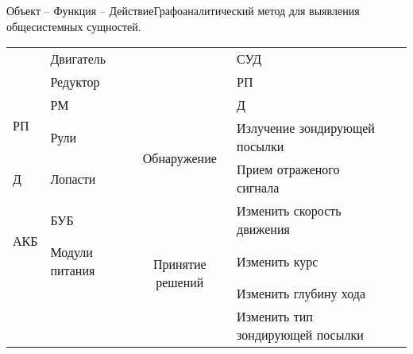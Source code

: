 \begin{frame}{Объект -- Функция -- Действие}{\small Графоаналитический метод для выявления общесистемных сущностей.}
\begin{tabular}{cp{}||c|p{}||cp{}}
    \multicolumn{1}{|l|}{}                     & Двигатель                                   &                                    & СУД                              &                                           &                                           \\ \cline{2-2} \cline{4-4}
    \multicolumn{1}{|l|}{}                     & Редуктор                                    &                                    & РП                               &                                           &                                           \\ \cline{1-2} \cline{4-4}
    \multicolumn{1}{|l|}{\multirow{2}{*}{РП}}  & РМ                                          &                                    & Д                                &                                           &                                           \\ \cline{2-4}
    \multicolumn{1}{|l|}{}                     & Рули                                        & \multirow{2}{*}{Обнаружение}       & Излучение зондирующей посылки    &                                           &                                           \\ \cline{1-2} \cline{4-4}
    \multicolumn{1}{|l|}{Д}                    & Лопасти                                     &                                    & Прием отраженого сигнала         &                                           &                                           \\ \cline{1-4}
    \multicolumn{1}{|l|}{\multirow{2}{*}{АКБ}} & БУБ                                         & \multirow{4}{*}{Принятие решений}  & Изменить скорость движения       &                                           &                                           \\ \cline{2-2} \cline{4-4}
    \multicolumn{1}{|l|}{}                     & Модули питания                              &                                    & Изменить курс                    &                                           &                                           \\ \cline{1-2} \cline{4-4}
                                               &                                             &                                    & Изменить глубину хода            &                                           &                                           \\ \cline{4-4}
                                               &                                             &                                    & Изменить тип зондирующей посылки &                                           &                                           \\ \cline{3-4}

\end{tabular}
\end{frame}
